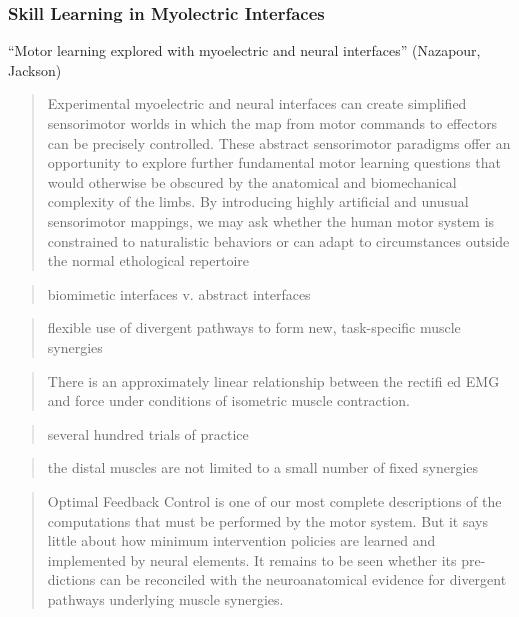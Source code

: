 \documentclass[../main.tex]{subfiles}
\begin{document}
\subsubsection{Skill Learning in Myolectric Interfaces}\label{skill-learning-in-myolectric-interfaces}

``Motor learning explored with myoelectric and neural interfaces''
(Nazapour, Jackson)

\begin{quote}
Experimental myoelectric and neural interfaces can create simplified sensorimotor worlds in which the map from motor commands to effectors can be precisely controlled. These abstract sensorimotor paradigms offer an opportunity to explore further fundamental motor learning questions that would otherwise be obscured by the anatomical and biomechanical complexity of the limbs. By introducing highly artificial and unusual sensorimotor mappings, we may ask whether the human motor system is constrained to naturalistic behaviors or can adapt to circumstances outside the normal ethological repertoire
\end{quote}

\begin{quote}
biomimetic interfaces v. abstract interfaces
\end{quote}

\begin{quote}
flexible use of divergent pathways to form new, task-specific muscle synergies
\end{quote}

\begin{quote}
There is an approximately linear relationship between the rectifi ed EMG and force under conditions of isometric muscle contraction.
\end{quote}

\begin{quote}
several hundred trials of practice
\end{quote}

\begin{quote}
the distal muscles are not limited to a small number of fixed synergies
\end{quote}

\begin{quote}
Optimal Feedback Control is one of our most complete descriptions of the computations that must be performed by the motor system. But it says little about how minimum intervention policies are learned and implemented by neural elements. It remains to be seen whether its pre-dictions can be reconciled with the neuroanatomical evidence for divergent pathways underlying muscle synergies.
\end{quote}
\end{document}
